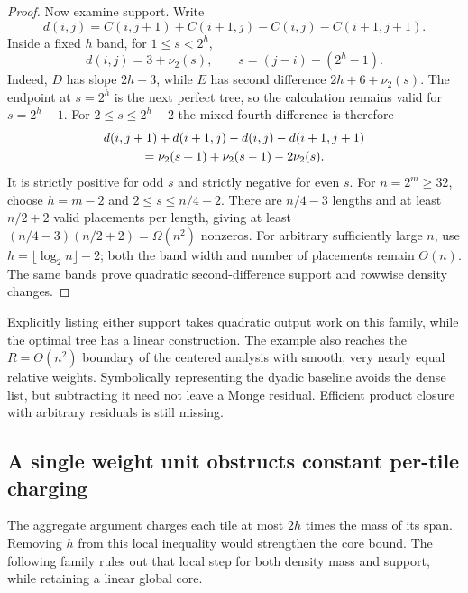 \documentclass[11pt]{article}
\begin{document}
\begin{proof}
Now examine support. Write
\[
 d(i,j)=C(i,j+1)+C(i+1,j)-C(i,j)-C(i+1,j+1).
\]
Inside a fixed $h$ band, for $1\le s<2^h$,
\begin{equation}\label{eq:ruler-density}
 d(i,j)=3+\nu_2(s),\qquad s=(j-i)-(2^h-1).
\end{equation}
Indeed, $D$ has slope $2h+3$, while $E$ has second difference
$2h+6+\nu_2(s)$. The endpoint at $s=2^h$ is the next perfect tree, so
the calculation remains valid for $s=2^h-1$.
For $2\le s\le2^h-2$ the mixed fourth difference is therefore
\begin{align}
 &d(i,j+1)+d(i+1,j)-d(i,j)-d(i+1,j+1)\notag\\
 &\hspace{3em}=\nu_2(s+1)+\nu_2(s-1)-2\nu_2(s).\label{eq:ruler-fourth}
\end{align}
It is strictly positive for odd $s$ and strictly negative for even $s$.
For $n=2^m\ge32$, choose $h=m-2$ and $2\le s\le n/4-2$.
There are $n/4-3$ lengths and at least $n/2+2$ valid placements per length,
giving at least $(n/4-3)(n/2+2)=\Omega(n^2)$ nonzeros. For arbitrary
sufficiently large $n$, use $h=\lfloor\log_2 n\rfloor-2$; both the band
width and number of placements remain $\Theta(n)$. The same bands prove
quadratic second-difference support and rowwise density changes.
\end{proof}

Explicitly listing either support takes quadratic output work on this
family, while the optimal tree has a linear construction. The example also reaches the $R=\Theta(n^2)$ boundary of
the centered analysis with smooth, very nearly equal relative weights.
Symbolically representing the dyadic baseline avoids the dense list, but
subtracting it need not leave a Monge residual. Efficient product closure
with arbitrary residuals is still missing.


\subsection{A single weight unit obstructs constant per-tile charging}
\label{sec:local-tile-obstruction}
The aggregate argument charges each tile at most $2h$ times the mass of
its span. Removing $h$ from this local inequality would strengthen the
core bound. The following family rules out that local step for both
density mass and support, while retaining a linear global core.
\end{document}
